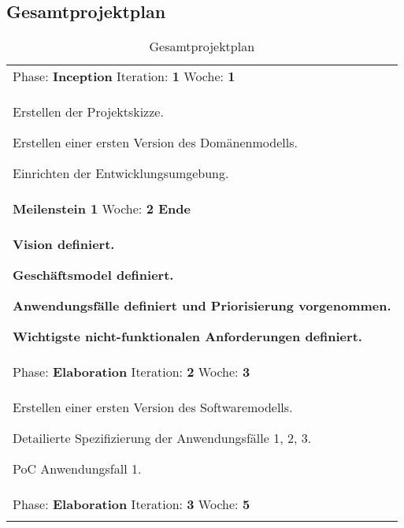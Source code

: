 \documentclass[11pt,ngerman]{article}
\begin{document}
    \subsection{Gesamtprojektplan}
    \begin{table}[H]
        \caption{Gesamtprojektplan}
        \begin{tabularx}{\textwidth}{X}
            \toprule
            Phase: \textbf{Inception} Iteration: \textbf{1} Woche: \textbf{1}\\
            \begin{compactitem}
                \item Erstellen der Projektskizze.
                \item Erstellen einer ersten Version des Domänenmodells.
                \item Einrichten der Entwicklungsumgebung.
            \end{compactitem}\\
            \toprule
            \rowcolor{lightgray}
            \textbf{Meilenstein 1} Woche: \textbf{2 Ende}\\
            \rowcolor{lightgray}
            \begin{compactitem}
                \item \textbf{Vision definiert.}
                \item \textbf{Geschäftsmodel definiert.}
                \item \textbf{Anwendungsfälle definiert und Priorisierung vorgenommen.}
                \item \textbf{Wichtigste nicht-funktionalen Anforderungen definiert.}
            \end{compactitem}\\
            \toprule
            Phase: \textbf{Elaboration} Iteration: \textbf{2} Woche: \textbf{3}\\
            \begin{compactitem}
                \item Erstellen einer ersten Version des Softwaremodells.
                \item Detailierte Spezifizierung der Anwendungsfälle 1, 2, 3.
                \item PoC Anwendungsfall 1.
            \end{compactitem}\\
            \toprule
            Phase: \textbf{Elaboration} Iteration: \textbf{3} Woche: \textbf{5}\\
            \begin{compactitem}

\end{compactitem}
\end{tabularx}
\end{table}
\end{document}
